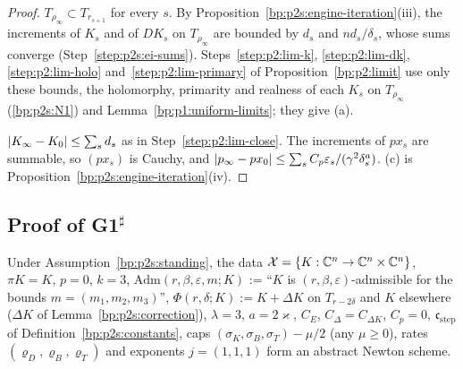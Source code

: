 \begin{proof}
\label{step:p2s:el-conv}
$T_{\rho_\infty}\subset T_{r_{s+1}}$ for every $s$. By Proposition~\ref{bp:p2s:engine-iteration}(iii), the increments of $K_s$ and of $DK_s$ on
$T_{\rho_\infty}$ are bounded by $d_s$ and $nd_s/\delta_s$, whose sums converge (Step~\ref{step:p2s:ei-sums}). Steps~\ref{step:p2:lim-k},
\ref{step:p2:lim-dk}, \ref{step:p2:lim-holo} and~\ref{step:p2:lim-primary} of Proposition~\ref{bp:p2:limit} use only these bounds, the holomorphy,
primarity and realness of each $K_s$ on $T_{\rho_\infty}$ (\ref{bp:p2s:N1}) and Lemma~\ref{bp:p1:uniform-limits}; they give (a).

\label{step:p2s:el-close}
$\lvert K_\infty-K_0\rvert\le\sum_sd_s$ as in Step~\ref{step:p2:lim-close}. The increments of $px_s$ are summable, so $(px_s)$ is Cauchy, and
$\lvert p_\infty-px_0\rvert\le\sum_sC_p\varepsilon_s/(\gamma^2\delta_s^a)$. (c) is Proposition~\ref{bp:p2s:engine-iteration}(iv).
\end{proof}

\subsection{Proof of G1$^\sharp$}\label{bp:p2s:sec-proof}

\begin{lemma}\label{bp:p2s:fixed-scheme}
Under Assumption~\ref{bp:p2s:standing}, the data $\mathcal X=\{K:\mathbb{C}^n\to\mathbb{C}^n\times\mathbb{C}^n\}$, $\pi K=K$, $p=0$, $k=3$,
$\mathrm{Adm}(r,\beta,\varepsilon,m;K)$ := ``$K$ is $(r,\beta,\varepsilon)$-admissible for the bounds $m=(m_1,m_2,m_3)$'',
$\Phi(r,\delta;K):=K+\Delta K$ on $T_{r-2\delta}$ and $K$ elsewhere ($\Delta K$ of Lemma~\ref{bp:p2s:correction}), $\lambda=3$, $a=2\varkappa$,
$C_E$, $C_\Delta=C_{\Delta K}$, $C_p=0$, $\mathfrak c_{\mathrm{step}}$ of Definition~\ref{bp:p2s:constants}, caps $(\sigma_K,\sigma_B,\sigma_T)-\mu/2$
(any $\mu\ge0$), rates $(\varrho_D,\varrho_B,\varrho_T)$ and exponents $j=(1,1,1)$ form an abstract Newton scheme.
\end{lemma}


